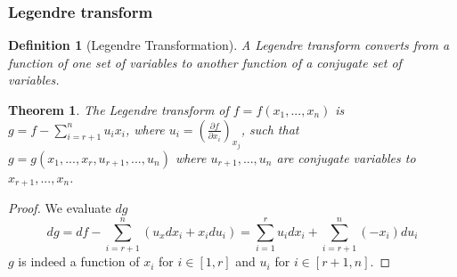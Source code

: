 \documentclass[a4paper]{article}
\theoremstyle{new}
\newtheorem{defi}{Definition}[section]
\newtheorem{thm}{Theorem}[section]
\begin{document}
\subsubsection*{Legendre transform}
\begin{defi}[Legendre Transformation]
A Legendre transform converts from a function of one set of variables to another function of a conjugate set of variables. 
\end{defi}
\begin{thm}
The Legendre transform of $f=f(x_1,...,x_n)$ is $g=f-\sum_{i=r+1}^nu_ix_i$, where $u_i=(\frac{\partial f}{\partial x_i})_{x_j}$, such that $g=g(x_1,...,x_r,u_{r+1},...,u_n)$ where $u_{r+1},...,u_n$ are conjugate variables to $x_{r+1},...,x_n$.
\end{thm}
\begin{proof}
We evaluate $dg$
$$dg=df-\sum_{i=r+1}^n(u_xdx_i+x_idu_i)=\sum_{i=1}^ru_idx_i+\sum_{i=r+1}^n(-x_i)du_i$$
$g$ is indeed a function of $x_i$ for $i\in[1,r]$ and $u_i$ for $i\in[r+1,n]$.
\end{proof}
\end{document}
